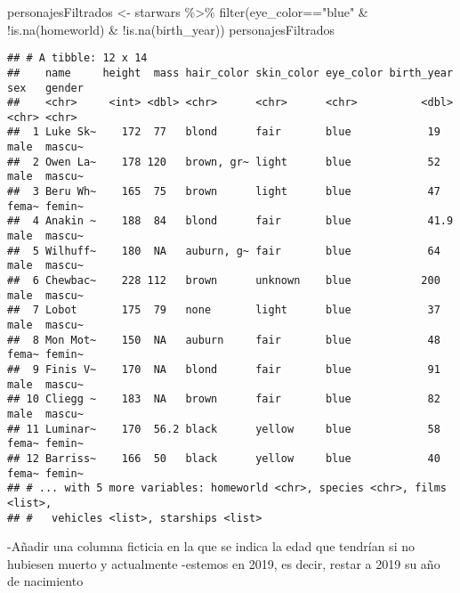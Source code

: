 \documentclass[
]{book}
\newenvironment{Shaded}{\begin{snugshade}}{\end{snugshade}}
\newcommand{\AttributeTok}[1]{\textcolor[rgb]{0.77,0.63,0.00}{#1}}
\newcommand{\DecValTok}[1]{\textcolor[rgb]{0.00,0.00,0.81}{#1}}
\newcommand{\FunctionTok}[1]{\textcolor[rgb]{0.00,0.00,0.00}{#1}}
\newcommand{\NormalTok}[1]{#1}
\newcommand{\OtherTok}[1]{\textcolor[rgb]{0.56,0.35,0.01}{#1}}
\newcommand{\SpecialCharTok}[1]{\textcolor[rgb]{0.00,0.00,0.00}{#1}}
\newcommand{\StringTok}[1]{\textcolor[rgb]{0.31,0.60,0.02}{#1}}
\begin{document}
\begin{Shaded}
\begin{Highlighting}[]
\NormalTok{personajesFiltrados }\OtherTok{\textless{}{-}}\NormalTok{ starwars }\SpecialCharTok{\%\textgreater{}\%} \FunctionTok{filter}\NormalTok{(eye\_color}\SpecialCharTok{==}\StringTok{"blue"} \SpecialCharTok{\&} \SpecialCharTok{!}\FunctionTok{is.na}\NormalTok{(homeworld) }\SpecialCharTok{\&} \SpecialCharTok{!}\FunctionTok{is.na}\NormalTok{(birth\_year))}
\NormalTok{personajesFiltrados}
\end{Highlighting}
\end{Shaded}

\begin{verbatim}
## # A tibble: 12 x 14
##    name     height  mass hair_color skin_color eye_color birth_year sex   gender
##    <chr>     <int> <dbl> <chr>      <chr>      <chr>          <dbl> <chr> <chr> 
##  1 Luke Sk~    172  77   blond      fair       blue            19   male  mascu~
##  2 Owen La~    178 120   brown, gr~ light      blue            52   male  mascu~
##  3 Beru Wh~    165  75   brown      light      blue            47   fema~ femin~
##  4 Anakin ~    188  84   blond      fair       blue            41.9 male  mascu~
##  5 Wilhuff~    180  NA   auburn, g~ fair       blue            64   male  mascu~
##  6 Chewbac~    228 112   brown      unknown    blue           200   male  mascu~
##  7 Lobot       175  79   none       light      blue            37   male  mascu~
##  8 Mon Mot~    150  NA   auburn     fair       blue            48   fema~ femin~
##  9 Finis V~    170  NA   blond      fair       blue            91   male  mascu~
## 10 Cliegg ~    183  NA   brown      fair       blue            82   male  mascu~
## 11 Luminar~    170  56.2 black      yellow     blue            58   fema~ femin~
## 12 Barriss~    166  50   black      yellow     blue            40   fema~ femin~
## # ... with 5 more variables: homeworld <chr>, species <chr>, films <list>,
## #   vehicles <list>, starships <list>
\end{verbatim}

-Añadir una columna ficticia en la que se indica la edad que tendrían si no hubiesen muerto y actualmente -estemos en 2019, es decir, restar a 2019 su año de nacimiento

\begin{Shaded}
\end{Shaded}
\end{document}
